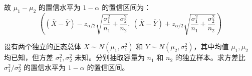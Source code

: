 ﻿\documentclass[lang=cn,11pt]{elegantbook}
\begin{document}
\begin{solution}
故 $\mu_1-\mu_2$ 的置信水平为 $1-\alpha$ 的置信区间为：
\begin{equation*}
\left((\overline{X}-\overline{Y}) - z_{\alpha/2}\sqrt{\frac{\sigma_1^2}{n_1}+\frac{\sigma_2^2}{n_2}},\ (\overline{X}-\overline{Y}) + z_{\alpha/2}\sqrt{\frac{\sigma_1^2}{n_1}+\frac{\sigma_2^2}{n_2}}\right)
\end{equation*}
\end{solution}


\begin{exercise} \label{ex:ci_ratio_var_known_mu}
设有两个独立的正态总体 $X \sim N(\mu_1, \sigma_1^2)$ 和 $Y \sim N(\mu_2, \sigma_2^2)$，其中均值 $\mu_1, \mu_2$ 均已知，但方差 $\sigma_1^2, \sigma_2^2$ 未知。分别抽取容量为 $n_1$ 和 $n_2$ 的独立样本。求方差比 $\sigma_1^2/\sigma_2^2$ 的置信水平为 $1-\alpha$ 的置信区间。
\end{exercise}
\end{document}
